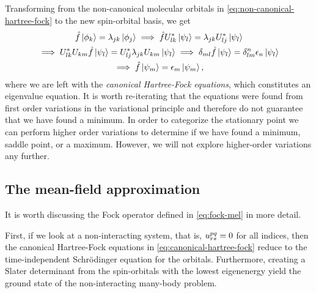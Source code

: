             Transforming from the non-canonical molecular orbitals in
            \autoref{eq:non-canonical-hartree-fock} to the new spin-orbital
            basis, we get
            \begin{gather}
                \hat{f}\ket*{\phi_k} = \lambda_{jk}\ket*{\phi_j}
                \implies
                \hat{f} U^{*}_{lk}\ket*{\psi_{l}}
                = \lambda_{jk} U^{*}_{lj} \ket*{\psi_l}
                \\
                \implies
                U^{*}_{lk} U_{km} \hat{f}\ket*{\psi_l}
                = U^{*}_{lj} \lambda_{jk} U_{km} \ket*{\psi_l}
                \implies
                \delta_{ml} \hat{f} \ket*{\psi_l}
                = \delta^{n}_{lm} \epsilon_{n} \ket*{\psi_l}
                \\
                \implies
                \hat{f}\ket*{\psi_m}
                = \epsilon_{m} \ket*{\psi_m},
                \label{eq:canonical-hartree-fock}
            \end{gather}
            where we are left with the \emph{canonical Hartree-Fock equations},
            which constitutes an eigenvalue equation.
            It is worth re-iterating that the equations were found from first
            order variations in the variational principle and therefore do not
            guarantee that we have found a minimum.
            In order to categorize the stationary point we can perform higher
            order variations to determine if we have found a minimum, saddle
            point, or a maximum.
            However, we will not explore higher-order variations any further.

        \subsection{The mean-field approximation}
            It is worth discussing the Fock operator defined in
            \autoref{eq:fock-mel} in more detail.

            First, if we look at a non-interacting system, that is,
            $u^{pq}_{rs} = 0$ for all indices, then the canonical
            Hartree-Fock equations in \autoref{eq:canonical-hartree-fock}
            reduce to the time-independent Schrödinger equation for the
            orbitals.
            Furthermore, creating a Slater determinant from the spin-orbitals
            with the lowest eigenenergy yield the ground state of the
            non-interacting many-body problem.

